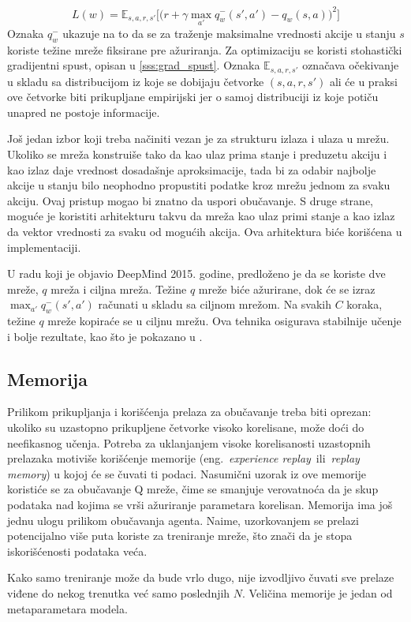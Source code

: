 \begin{equation}
	L(w) = \mathbb{E}_{s,a,r,s'}\bigg[ \big(r + \gamma \max_{a'}q_w^-(s',a') - q_w(s,a)\big) ^2 \bigg]
\end{equation} %
Oznaka $q_w^-$ ukazuje na to da se za traženje maksimalne vrednosti akcije u stanju $s$ koriste težine mreže fiksirane pre ažuriranja. Za optimizaciju se koristi stohastički gradijentni spust, opisan u \ref{sss:grad_spust}. Oznaka $\mathbb{E}_{s,a,r,s'}$ označava očekivanje u skladu sa distribucijom iz koje se dobijaju četvorke $(s,a,r,s')$ ali će u praksi ove četvorke biti prikupljane empirijski jer o samoj distribuciji iz koje potiču unapred ne postoje informacije. 
\par 
Još jedan izbor koji treba načiniti vezan je za strukturu izlaza i ulaza u mrežu. Ukoliko se mreža konstruiše tako da kao ulaz prima stanje i preduzetu akciju i kao izlaz daje vrednost dosadašnje aproksimacije, tada bi za odabir najbolje akcije u stanju bilo neophodno propustiti podatke kroz mrežu jednom za svaku akciju. Ovaj pristup mogao bi znatno da uspori obučavanje. S druge strane, moguće je koristiti arhitekturu takvu da mreža kao ulaz primi stanje a kao izlaz da vektor vrednosti za svaku od mogućih akcija. Ova arhitektura biće korišćena u implementaciji.
\par 
U radu koji je objavio DeepMind 2015. godine, predloženo je da se koriste dve mreže, $q$ mreža i ciljna mreža. Težine $q$ mreže biće ažurirane, dok će se izraz $\max_{a'}q_w^-(s',a')$ računati u skladu sa ciljnom mrežom. Na svakih $C$ koraka, težine $q$ mreže kopiraće se u ciljnu mrežu. Ova tehnika osigurava stabilnije učenje i bolje rezultate, kao što je pokazano u \cite{dqn_dm}.

\subsection{Memorija}
Prilikom prikupljanja i korišćenja prelaza za obučavanje treba biti oprezan: ukoliko su uzastopno prikupljene četvorke visoko korelisane, može doći do neefikasnog učenja. Potreba za uklanjanjem visoke korelisanosti uzastopnih prelazaka motiviše korišćenje memorije (eng.~{\em experience replay}~ili~{\em replay memory}) u kojoj će se čuvati ti podaci. Nasumični uzorak iz ove memorije koristiće se za obučavanje Q mreže, čime se smanjuje verovatnoća da je skup podataka nad kojima se vrši ažuriranje parametara korelisan. Memorija ima još jednu ulogu prilikom obučavanja agenta. Naime, uzorkovanjem se prelazi potencijalno više puta koriste za treniranje mreže, što znači da je stopa iskorišćenosti podataka veća. 
\par 
Kako samo treniranje može da bude vrlo dugo, nije izvodljivo čuvati sve prelaze viđene do nekog trenutka već samo poslednjih $N$. Veličina memorije je jedan od metaparametara modela.

